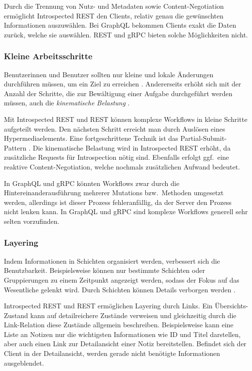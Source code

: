 \para{}Durch die Trennung von Nutz- und Metadaten sowie Content-Negotiation ermöglicht Introspected REST den Clients, relativ genau die gewünschten Informationen auszuwählen. Bei GraphQL bekommen Clients exakt die Daten zurück, welche sie auswählen. REST und gRPC bieten solche Möglichkeiten nicht.


\subsubsection{Kleine Arbeitsschritte}
Benutzerinnen und Benutzer sollten nur kleine und lokale Änderungen durchführen müssen, um ein Ziel zu erreichen \autocite{Clarke2003}. Andererseits erhöht sich mit der Anzahl der Schritte, die zur Bewältigung einer Aufgabe durchgeführt werden müssen, auch die \emph{kinematische Belastung} \autocite[S.~178]{Lidwell2010}.

\para{}Mit Introspected REST und REST können komplexe Workflows in kleine Schritte aufgeteilt werden. Den nächsten Schritt erreicht man durch Auslösen eines Hypermediaelements. Eine fortgeschrittene Technik ist das Partial-Submit-Pattern \autocite{Amundsen2016}. Die kinematische Belastung wird in Introspected REST erhöht, da zusätzliche Requests für Introspection nötig sind. Ebenfalls erfolgt ggf.\ eine reaktive Content-Negotiation, welche nochmals zusätzlichen Aufwand bedeutet.

In GraphQL und gRPC könnten Workflows zwar durch die Hintereinanderausführung mehrerer Mutations bzw.\ Methoden umgesetzt werden, allerdings ist dieser Prozess fehleranfällig, da der Server den Prozess nicht lenken kann. In GraphQL und gRPC sind komplexe Workflows generell sehr selten vorzufinden.


\subsubsection{Layering}
Indem Informationen in Schichten organisiert werden, verbessert sich die Benutzbarkeit. Beispielsweise können nur bestimmte Schichten oder Gruppierungen zu einem Zeitpunkt angezeigt werden, sodass der Fokus auf das Wesentliche gelenkt wird. Durch Schichten können Details verborgen werden \autocite[S.~146]{Lidwell2010}.

\para{}Introspected REST und REST ermöglichen Layering durch Links. Ein Übersichts-Zustand kann auf detailreichere Zustände verweisen und gleichzeitig durch die Link-Relation diese Zustände allgemein beschreiben. Beispielsweise kann eine Liste an Notizen nur die wichtigsten Informationen wie ID und Titel darstellen, aber auch einen Link zur Detailansicht einer Notiz bereitstellen. Befindet sich der Client in der Detailansicht, werden gerade nicht benötigte Informationen ausgeblendet.

